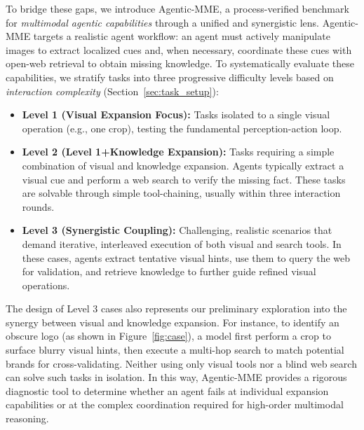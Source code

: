 \documentclass[runningheads]{llncs}
\theoremstyle{plain}
\theoremstyle{definition}
\theoremstyle{remark}
\begin{document}
To bridge these gaps, we introduce Agentic-MME, a process-verified benchmark for \emph{multimodal agentic capabilities} through a unified and synergistic lens. Agentic-MME targets a realistic agent workflow: an agent must actively manipulate images to extract localized cues and, when necessary, coordinate these cues with open-web retrieval to obtain missing knowledge. 
To systematically evaluate these capabilities, we stratify tasks into three progressive difficulty levels based on \emph{interaction complexity} (Section~\ref{sec:task_setup}):
\begin{itemize}[leftmargin=*]
\vspace{-2mm}
\item \textbf{Level 1 (Visual Expansion Focus):} Tasks isolated to a single visual operation (e.g., one crop), testing the fundamental perception-action loop.
\item \textbf{Level 2 (Level 1+Knowledge Expansion):} Tasks requiring a simple combination of visual and knowledge expansion. Agents typically extract a visual cue and perform a web search to verify the missing fact. These tasks are solvable through simple tool-chaining, usually within three interaction rounds.
\item \textbf{Level 3 (Synergistic Coupling):} Challenging, realistic scenarios that demand iterative, interleaved execution of both visual and search tools. In these cases, agents extract tentative visual hints, use them to query the web for validation, and retrieve knowledge to further guide refined visual operations.
\end{itemize}
The design of Level 3 cases also represents our preliminary exploration into the synergy between visual and knowledge expansion. For instance, to identify an obscure logo (as shown in Figure~\ref{fig:case}), a model first perform a crop to surface blurry visual hints, then execute a multi-hop search to match potential brands for cross-validating. Neither using only visual tools nor a blind web search can solve such tasks in isolation. In this way, Agentic-MME provides a rigorous diagnostic tool to determine whether an agent fails at individual expansion capabilities or at the complex coordination required for high-order multimodal reasoning.
\end{document}
